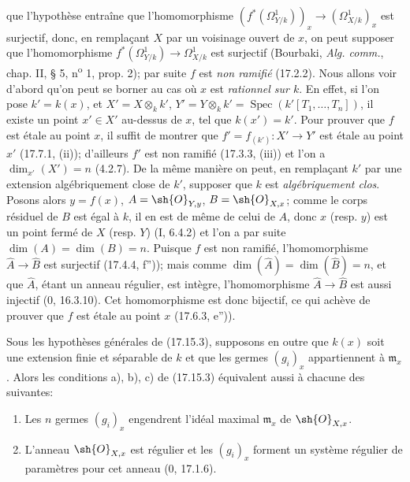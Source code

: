 
que l'hypothèse entraîne que l'homomorphisme $(f^*(\Omega^1_{Y/k}))_x\to(\Omega^1_{X/k})_x$ est surjectif, donc, en remplaçant $X$ par un voisinage ouvert de $x$, on peut supposer que l'homomorphisme $f^*(\Omega^1_{Y/k})\to\Omega^1_{X/k}$ est surjectif (Bourbaki, \emph{Alg. comm.}, chap. II, § 5, n\textsuperscript{o} 1, prop. 2); par suite $f$ est \emph{non ramifié} (17.2.2). Nous allons voir d'abord qu'on peut se borner au cas où $x$ est \emph{rationnel sur $k$}. En effet, si l'on pose $k'=k(x)$, et $X'=X\otimes_k k'$, $Y'=Y\otimes_k k'=\operatorname{Spec}(k'[T_1,\ldots,T_n])$, il existe un point $x'\in X'$ au-dessus de $x$, tel que $k(x')=k'$. Pour prouver que $f$ est étale au point $x$, il suffit de montrer que $f'=f_{(k')}:X'\to Y'$ est étale au point $x'$ (17.7.1, (ii)); d'ailleurs $f'$ est non ramifié (17.3.3, (iii)) et l'on a $\dim_{x'}(X')=n$ (4.2.7). De la même manière on peut, en remplaçant $k'$ par une extension algébriquement close de $k'$, supposer que $k$ est \emph{algébriquement clos}. Posons alors $y=f(x)$, $A=\sh{O}_{Y,y}$, $B=\sh{O}_{X,x}$; comme le corps résiduel de $B$ est égal à $k$, il en est de même de celui de $A$, donc $x$ (resp. $y$) est un point fermé de $X$ (resp. $Y$) (I, 6.4.2) et l'on a par suite $\dim(A)=\dim(B)=n$. Puisque $f$ est non ramifié, l'homomorphisme $\widehat A\to\widehat B$ est surjectif (17.4.4, f'')); mais comme $\dim(\widehat A)=\dim(\widehat B)=n$, et que $\widehat A$, étant un anneau régulier, est intègre, l'homomorphisme $\widehat A\to\widehat B$ est aussi injectif (0, 16.3.10). Cet homomorphisme est donc bijectif, ce qui achève de prouver que $f$ est étale au point $x$ (17.6.3, e'')).

\begin{corollary}[17.15.4]
\label{IV.17.15.4}
Sous les hypothèses générales de (17.15.3), supposons en outre que $k(x)$ soit une extension finie et séparable de $k$ et que les germes $(g_i)_x$ appartiennent à $\mathfrak m_x$. Alors les conditions a), b), c) de (17.15.3) équivalent aussi à chacune des suivantes:
\begin{enumerate}
  \item[d)] Les $n$ germes $(g_i)_x$ engendrent l'idéal maximal $\mathfrak m_x$ de $\sh{O}_{X,x}$.
  \item[d')] L'anneau $\sh{O}_{X,x}$ est régulier et les $(g_i)_x$ forment un système régulier de paramètres pour cet anneau (0, 17.1.6).
\end{enumerate}
\end{corollary}

